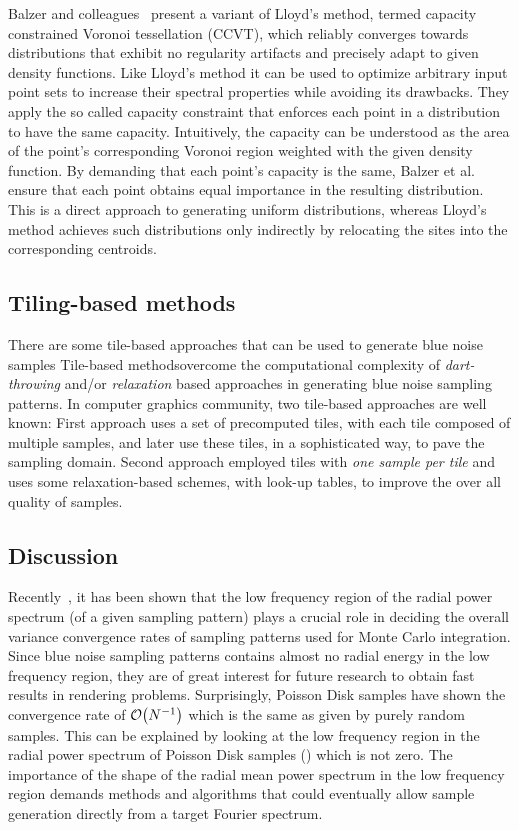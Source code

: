 Balzer and colleagues~\cite{Balzer:2009:CPD:1531326.1531392} present a variant of Lloyd’s method, termed capacity constrained Voronoi 
tessellation (CCVT), which reliably converges towards distributions that exhibit no regularity artifacts and precisely adapt 
to given density functions. Like Lloyd’s 
method it can be used to optimize arbitrary input point sets to increase their spectral properties while avoiding its 
drawbacks. They apply the so called capacity constraint that enforces each point in a distribution to have the same 
capacity. Intuitively, the capacity can be understood as the area of the point’s corresponding Voronoi region weighted with 
the given density function. By demanding that each point’s capacity is the same, Balzer et al. ensure that each point 
obtains equal importance in the resulting distribution. This is a direct approach to generating uniform 
distributions, whereas Lloyd’s method achieves such distributions only indirectly by relocating the sites into the 
corresponding centroids.

\subsection{Tiling-based methods}

There are some tile-based approaches that can be used to generate blue noise samples 
Tile-based methodsovercome the computational complexity of  
\emph{dart-throwing} and/or \emph{relaxation} based approaches in generating blue noise sampling patterns. In computer graphics community, two tile-based approaches are well known: First approach uses a set of precomputed tiles, with each tile composed of multiple samples, and later use these tiles, in a sophisticated way, to pave the sampling domain. Second approach employed tiles with \emph{one sample per tile} and uses some relaxation-based schemes, with look-up tables, to improve the over all quality of samples. 

\subsection{Discussion}

Recently~\cite{Pilleboue:2015:VAM}, it has been shown that the low frequency region of the
radial power spectrum (of a given sampling pattern) plays a crucial role in deciding the overall variance convergence rates of sampling 
patterns used for Monte Carlo integration. Since blue noise sampling patterns contains almost no radial 
energy in the low frequency region, they are of great interest for future research to obtain fast results in 
rendering problems. Surprisingly, Poisson Disk samples have shown the convergence rate of $\mathcal{O}\!\left(N^{-1}\right)$ which is the same as given by purely random samples. This can be explained by looking at the low frequency region in the radial power spectrum of Poisson Disk samples () which is not zero.
The importance of the shape of the radial mean power spectrum in the  low frequency region demands  methods and algorithms that could eventually allow sample generation directly from a target Fourier spectrum.